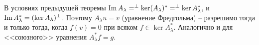 \begin{note}
    В условиях предыдущей теоремы $\operatorname{Im} A_\lambda = ^\perp \ker (A_\lambda )^* = ^\perp\ker A^*_\lambda$, и $\operatorname{Im} A_\lambda^* = (\ker A_\lambda)^\perp$.
    Поэтому $A_\lambda u = v$ (уравнение Фредгольма) -- разрешимо тогда и только тогда, когда $f(v) = 0$ при всяком $f \in \ker A_\lambda^*$.
    Аналогично и для <<союзного>> уравнения $A^*_\lambda f = g$.
\end{note}